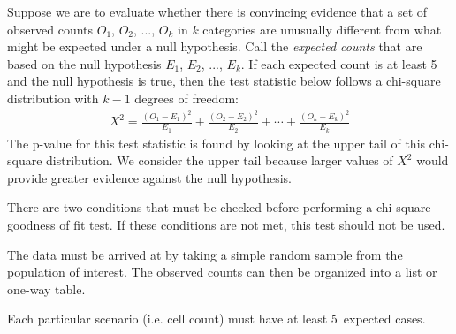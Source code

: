 \begin{termBox}{
Suppose we are to evaluate whether there is convincing evidence that a set of observed counts $O_1$, $O_2$, ..., $O_k$ in $k$ categories are unusually different from what might be expected under a null hypothesis. Call the \emph{expected counts} that are based on the null hypothesis $E_1$, $E_2$, ..., $E_k$. If each expected count is at least 5 and the null hypothesis is true, then the test statistic below follows a chi-square distribution with $k-1$ degrees of freedom:
\begin{align*}
X^2 = \frac{(O_1 - E_1)^2}{E_1} + \frac{(O_2 - E_2)^2}{E_2} + \cdots + \frac{(O_k - E_k)^2}{E_k}
\end{align*}
The p-value for this test statistic is found by looking at the upper tail of this chi-square distribution. We consider the upper tail because larger values of $X^2$ would provide greater evidence against the null hypothesis.}
\end{termBox}

\begin{tipBox}{
There are two conditions that must be checked before performing a chi-square goodness of fit test. If these conditions are not met, this test should not be used.\vspace{-1mm}
\begin{description}
\setlength{\itemsep}{0mm}
\item[Simple random sample.] The data must be arrived at by taking a simple random sample from the population of interest. The observed counts can then be organized into a list or one-way table.
\item[All Expected Counts at least 5] Each particular scenario (i.e. cell count) must have at least 5~expected cases.
\vspace{-2mm}
\end{description}
}
\end{tipBox}



